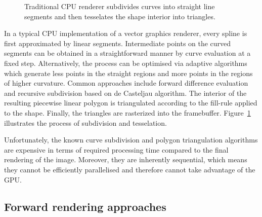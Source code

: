 \documentclass[11pt,a4paper,twoside]{article}
\begin{document}
\begin {figure} [ht]
	\centering
	\hspace{2.0cm}
	\caption {Traditional CPU renderer subdivides curves into straight line segments and then tesselates the shape interior into triangles.}
	\label {fig:cpu}
\end {figure}

In a typical CPU implementation of a vector graphics renderer, every spline is first approximated by linear segments. Intermediate points on the curved segments can be obtained in a straightforward manner by curve evaluation at a fixed step. Alternatively, the process can be optimised via adaptive algorithms which generate less points in the straight regions and more points in the regions of higher curvature. Common approaches include forward difference evaluation and recursive subdivision based on de Casteljau algorithm. The interior of the resulting piecewise linear polygon is triangulated according to the fill-rule applied to the shape. Finally, the triangles are rasterized into the framebuffer. Figure~\ref{fig:cpu} illustrates the process of subdivision and tesselation.

Unfortunately, the known curve subdivision and polygon triangulation algorithms are expensive in terms of required processing time compared to the final rendering of the image. Moreover, they are inherently sequential, which means they cannot be efficiently parallelised and therefore cannot take advantage of the GPU.

\subsection {Forward rendering approaches}
\end{document}

